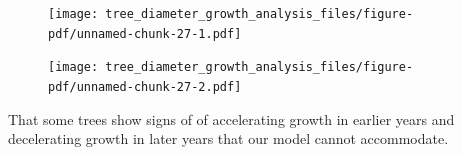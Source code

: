 \documentclass[
  letterpaper,
  DIV=11,
  numbers=noendperiod]{scrartcl}
\begin{document}
\begin{figure}[H]

{\centering \texttt{[image: tree\_diameter\_growth\_analysis\_files/figure-pdf/unnamed-chunk-27-1.pdf]}

}

\end{figure}

\begin{figure}[H]

{\centering \texttt{[image: tree\_diameter\_growth\_analysis\_files/figure-pdf/unnamed-chunk-27-2.pdf]}

}

\end{figure}

That some trees show signs of of accelerating growth in earlier years
and decelerating growth in later years that our model cannot
accommodate.
\end{document}
